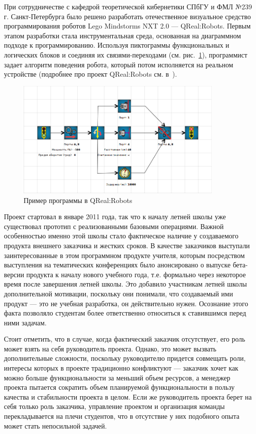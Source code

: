 \documentclass[a4paper]{article}
\begin{document}
При сотрудничестве с кафедрой теоретической кибернетики СПбГУ и ФМЛ №239 г. Санкт-Петербурга было решено разработать отечественное визуальное средство программирования роботов Lego Mindstorms NXT 2.0 --- QReal:Robots. Первым этапом разработки стала инструментальная среда, основанная на диаграммном подходе к программированию. Используя пиктограммы функциональных и логических блоков и соединяя их связями-переходами (см. рис.~\ref{qreal-robots}), программист задает алгоритм поведения робота, который потом исполняется на реальном устройстве (подробнее про проект QReal:Robots см. в~\cite{robots}).

\begin{figure} [ht]
  \begin{center}
    \includegraphics[width=0.9\textwidth]{02-qreal-robots.png}
    \caption{Пример программы в QReal:Robots}
    \label{qreal-robots}
  \end{center}
\end{figure}

Проект стартовал в январе 2011 года, так что к началу летней школы уже существовал прототип с реализованными базовыми операциями. Важной особенностью именно этой школы стало фактическое наличие у создаваемого продукта внешнего заказчика и жестких сроков. В качестве заказчиков выступали заинтересованные в этом программном продукте учителя, которым посредством выступления на тематических конференциях было анонсировано о выпуске бета-версии продукта к началу нового учебного года, т.е. формально через некоторое время после завершения летней школы. Это добавило участникам летней школы дополнительной мотивации, поскольку они понимали, что создаваемый ими продукт --- это не учебная разработка, он действительно нужен. Осознание этого факта позволяло студентам более ответственно относиться к ставившимся перед ними задачам. 

Стоит отметить, что в случае, когда фактический заказчик отсутствует, его роль может взять на себя руководитель проекта. Однако, это может вызвать дополнительные сложности, поскольку руководителю придется совмещать роли, интересы которых в проекте традиционно конфликтуют --- заказчик хочет как можно больше функциональности за меньший объем ресурсов, а менеджер проекта пытается сократить объем планируемой функциональности в пользу качества и стабильности проекта в целом. Если же руководитель проекта берет на себя только роль заказчика, управление проектом и организация команды перекладывается на плечи студентов, что в отсутствие у них подобного опыта может стать непосильной задачей.
\end{document}
